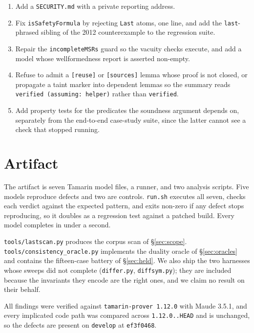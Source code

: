 \documentclass[version=preprint]{iacrcc}
\newcommand{\code}[1]{\texttt{\small #1}}
\theoremstyle{definition}
\theoremstyle{remark}
\begin{document}
\begin{enumerate}
	\item Add a \code{SECURITY.md} with a private reporting address.
	\item Fix \code{isSafetyFormula} by rejecting \code{Last} atoms, one line, and
	      add the \code{last}-phrased sibling of the 2012 counterexample to the
	      regression suite.
	\item Repair the \code{incompleteMSRs} guard so the vacuity checks execute,
	      and add a model whose wellformedness report is asserted non-empty.
	\item Refuse to admit a \code{[reuse]} or \code{[sources]} lemma whose proof
	      is not closed, or propagate a taint marker into dependent lemmas so the
	      summary reads \code{verified (assuming: helper)} rather than
	      \code{verified}.
	\item Add property tests for the predicates the soundness argument depends
	      on, separately from the end-to-end case-study suite, since the latter
	      cannot see a check that stopped running.
\end{enumerate}

\section{Artifact}\label{sec:artifact}

The artifact is seven Tamarin model files, a runner, and two analysis scripts.
Five models reproduce defects and two are controls. \code{run.sh} executes all
seven, checks each verdict against the expected pattern, and exits non-zero if
any defect stops reproducing, so it doubles as a regression test against a
patched build. Every model completes in under a second.

\code{tools/lastscan.py} produces the corpus scan of \S\ref{sec:scope}.
\code{tools/consistency\_oracle.py} implements the duality oracle of
\S\ref{sec:oracles} and contains the fifteen-case battery of \S\ref{sec:held}.
We also ship the two harnesses whose sweeps did not complete
(\code{differ.py}, \code{diffsym.py}); they are included because the invariants
they encode are the right ones, and we claim no result on their behalf.

All findings were verified against \code{tamarin-prover 1.12.0} with Maude
3.5.1, and every implicated code path was compared across \code{1.12.0..HEAD}
and is unchanged, so the defects are present on \code{develop} at
\code{ef3f0468}.
\end{document}
